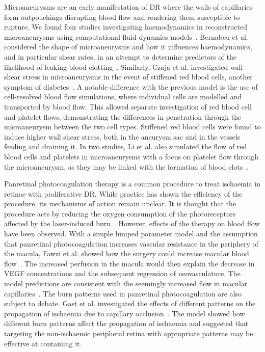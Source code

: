 \documentclass{article}
\begin{document}
Microaneurysms are an early manifestation of DR where the walls of capillaries form outpouchings disrupting blood flow and rendering them susceptible to rupture.
We found four studies investigating haemodynamics in reconstructed microaneurysms using computational fluid dynamics models~\cite{Bernabeu_2018,Czaja_2022,Li_2020,Li_2022}.
Bernabeu et al. considered the shape of microaneurysms and how it influences haemodynamics, and in particular shear rates, in an attempt to determine predictors of the likelihood of leaking blood clotting~\cite{Bernabeu_2018}.
Similarly, Czaja et al. investigated wall shear stress in microaneurysms in the event of stiffened red blood cells, another symptom of diabetes~\cite{Czaja_2022}.
A notable difference with the previous model is the use of cell-resolved blood flow simulations, where individual cells are modelled and transported by blood flow.
This allowed separate investigation of red blood cell and platelet flows, demonstrating the differences in penetration through the microaneurysm between the two cell types.
Stiffened red blood cells were found to induce higher wall shear stress, both in the aneurysm sac and in the vessels feeding and draining it.
In two studies, Li et al. also simulated the flow of red blood cells and platelets in microaneurysms with a focus on platelet flow through the microaneurysm, as they may be linked with the formation of blood clots~\cite{Li_2020,Li_2022}.


Panretinal photocoagulation therapy is a common procedure to treat ischaemia in retinae with proliferative DR.
While practice has shown the efficiency of the procedure, its mechanisms of action remain unclear.
It is thought that the procedure acts by reducing the oxygen consumption of the photoreceptors affected by the laser-induced burn~\cite{Fawzi_2019,Gast_2016}.
However, effects of the therapy on blood flow have been observed.
With a simple lumped parameter model and the assumption that panretinal photocoagulation increases vascular resistance in the periphery of the macula, Fawzi et al. showed how the surgery could increase macular blood flow~\cite{Fawzi_2019}.
The increased perfusion in the macula would then explain the decrease in VEGF concentrations and the subsequent regression of neovasculature.
The model predictions are consistent with the seemingly increased flow in macular capillaries~\cite{Fawzi_2019}.
The burn patterns used in panretinal photocoagulation are also subject to debate.
Gast et al. investigated the effects of different patterns on the propagation of ischaemia due to capillary occlusion~\cite{Gast_2016}.
The model showed how different burn patterns affect the propagation of ischaemia and suggested that targeting the non-ischaemic peripheral retina with appropriate patterns may be effective at containing it.
\end{document}
